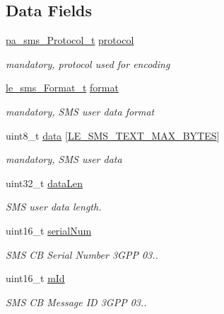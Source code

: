\subsection*{Data Fields}
\begin{DoxyCompactItemize}
\item 
\hyperlink{pa__sms_8h_a2bfd5b5bfad47343ed4776737b50af0f}{pa\+\_\+sms\+\_\+\+Protocol\+\_\+t} \hyperlink{structpa__sms___cell_broadcast__t_a8d93f8f943618e61f54cac753aa6f711}{protocol}
\begin{DoxyCompactList}\small\item\em mandatory, protocol used for encoding \end{DoxyCompactList}\item 
\hyperlink{le__sms__interface_8h_a337778c44e63660c44fa2116699296c0}{le\+\_\+sms\+\_\+\+Format\+\_\+t} \hyperlink{structpa__sms___cell_broadcast__t_a2294462515e869a958a337e44c5296b3}{format}
\begin{DoxyCompactList}\small\item\em mandatory, S\+MS user data format \end{DoxyCompactList}\item 
uint8\+\_\+t \hyperlink{structpa__sms___cell_broadcast__t_a70bfdbb646c8a594bc1c29151e67fec9}{data} \mbox{[}\hyperlink{le__sms__interface_8h_a0dc5c2cec7c1fb166c47393fbb07e43f}{L\+E\+\_\+\+S\+M\+S\+\_\+\+T\+E\+X\+T\+\_\+\+M\+A\+X\+\_\+\+B\+Y\+T\+ES}\mbox{]}
\begin{DoxyCompactList}\small\item\em mandatory, S\+MS user data \end{DoxyCompactList}\item 
uint32\+\_\+t \hyperlink{structpa__sms___cell_broadcast__t_a64ea7148f8f9a2ca95497b47e988fe38}{data\+Len}
\begin{DoxyCompactList}\small\item\em S\+MS user data length. \end{DoxyCompactList}\item 
uint16\+\_\+t \hyperlink{structpa__sms___cell_broadcast__t_a2535d69dd64dfdf9f8eeed3072a2937e}{serial\+Num}
\begin{DoxyCompactList}\small\item\em S\+MS CB Serial Number 3\+G\+PP 03.. \end{DoxyCompactList}\item 
uint16\+\_\+t \hyperlink{structpa__sms___cell_broadcast__t_a6a00f9d2dc6c7e7ceb6045118f0b1118}{m\+Id}
\begin{DoxyCompactList}\small\item\em S\+MS CB Message ID 3\+G\+PP 03.. \end{DoxyCompactList}\item 

\end{DoxyCompactItemize}
